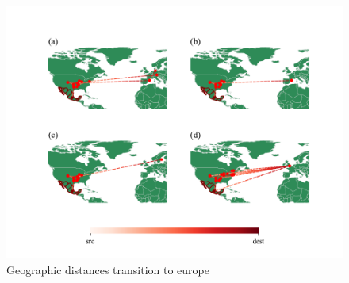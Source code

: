 \documentclass{article}
\begin{document}
\begin{figure}[h!]
    \centering
    \includegraphics[width=\linewidth]{airport_geographic_europe.pdf}
    \caption{Geographic distances transition to europe}%
    \label{fig:Europe}
\end{figure}


  
  
\end{document}
